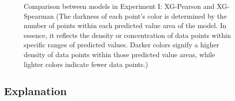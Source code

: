 \documentclass[12pt,a4paper,english
]{tunithesis}
\begin{document}
\begin{figure}
\begin{center}
    \qquad                        
      
    \caption[Results comparison in Experiment I]{Comparison between models in Experiment I: XG-Pearson and XG-Spearman (The darkness of each point's color is determined by the number of points within each predicted value area of the model. In essence, it reflects the density or concentration of data points within specific ranges of predicted values. Darker colors signify a higher density of data points within those predicted value areas, while lighter colors indicate fewer data points.)}    
    \label{fig:experiment_1_result}
  \end{center}
\end{figure}


\subsection{Explanation}
\end{document}
